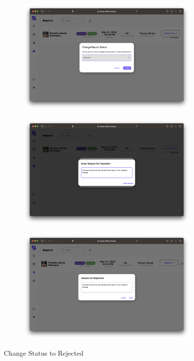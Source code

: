 \begin{figure}[!h]
    \centering
    \begin{subfigure}[c]{1\linewidth}
        \centering
        \includegraphics[scale=0.20]{figures/Chapter4/PNP/Rejected-1.png}
    \end{subfigure}
    \centering
    \begin{subfigure}[c]{1\linewidth}
        \centering
        \includegraphics[scale=0.20]{figures/Chapter4/PNP/Rejected-2.png}
    \end{subfigure}
    \centering
    \begin{subfigure}[c]{1\linewidth}
        \centering
        \includegraphics[scale=0.20]{figures/Chapter4/PNP/Rejected-4.png}
    \end{subfigure}
    \caption{Change Status to Rejected}
    \label{fig:ChangeStatusRejected}
\end{figure}

